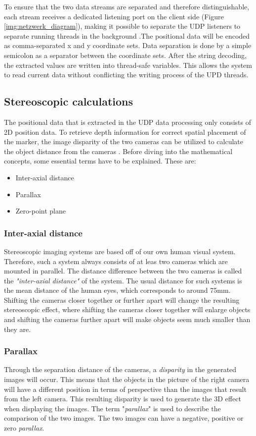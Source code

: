 To ensure that the two data streams are separated and therefore distinguishable, each stream receives a dedicated listening port on the client side (Figure \ref{img:netzwerk_diagram}), making it possible to separate the UDP listeners to separate running threads in the background .The positional data will be encoded as comma-separated x and y coordinate sets. Data separation is done by a simple semicolon as a separator between the coordinate sets. After the string decoding, the extracted values are written into thread-safe variables. This allows the system to read current data without conflicting the writing process of the UPD threads.
\subsection{Stereoscopic calculations}
The positional data that is extracted in the UDP data processing only consists of 2D position data. To retrieve depth information for correct spatial placement of the marker, the image disparity of the two cameras can be utilized to calculate the object distance from the cameras \cite{Tauer.2010}.\newpage
Before diving into the mathematical concepts, some essential terms have to be explained.
These are:
\begin{itemize}
\item Inter-axial distance
\item Parallax
\item Zero-point plane
\end{itemize}
\subsubsection{Inter-axial distance}
Stereoscopic imaging systems are based off of our own human visual system. Therefore, such a system always consists of at leas two cameras which are mounted in parallel. The distance difference between the two cameras is called the \textit{"inter-axial distance"} of the system. The usual distance for such systems is the mean distance of the human eyes, which corresponds to around 75mm. Shifting the cameras closer together or further apart will change the resulting stereoscopic effect, where shifting the cameras closer together will enlarge objects and shifting the cameras further apart will make objects seem much smaller than they are. 
\subsubsection{Parallax}
Through the separation distance of the cameras, a \textit{disparity} in the generated images will occur. This means that the objects in the picture of the right camera will have a different position in terms of perspective than the images that result from the left camera. This resulting disparity is used to generate the 3D effect when displaying the images. The term "\textit{parallax}" is used to describe the comparison of the two images. The two images can have a negative, positive or zero \textit{parallax}.
